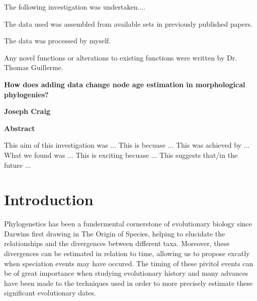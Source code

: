 \documentclass[11pt,letterpaper]{article}
\begin{document}
The following investigation was undertaken....

The data used was assembled from available sets in previously published papers.

The data was processed by myself.

Any novel functions or alterations to existing functions were written by Dr. Thomas Guillerme.


\newpage

\setcounter{page}{1}
\thispagestyle{plain}
\begin{center}
	\large
	\textbf{How does adding data change node age estimation in morphological phylogenies?}

	\vspace{0.4cm}
	\textbf{Joseph Craig}

	\vspace{0.9cm}
	\textbf{Abstract}
\end{center}

This aim of this investigation was ...
This is becuase ...
This was achieved by ...
What we found was ... 
This is exciting becuase ...
This suggests that/in the future ...

\newpage

\tableofcontents

\newpage

\section{Introduction}

Phylogenetics has been a fundermental cornerstone of evolutionary biology since Darwins first drawing in The Origin of Species, helping to elucidate the relationships and the divergences between different taxa. Moreover, these divergences can be estimated in relation to time, allowing us to propose excatly when speciation events may have occured. The timing of these pivitol events can be of great importance when studying evolutionary history and many advances have been made to the techniques used in order to more precisely estimate these significant evolutionary dates.
\end{document}
